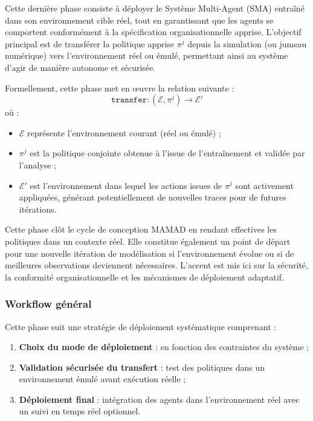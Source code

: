 \documentclass[pdflatex,sn-mathphys-num]{sn-jnl}%
\theoremstyle{thmstyleone}%
\theoremstyle{thmstyletwo}%
\theoremstyle{thmstylethree}%
\begin{document}
Cette dernière phase consiste à déployer le Système Multi-Agent (SMA) entraîné dans son environnement cible réel, tout en garantissant que les agents se comportent conformément à la spécification organisationnelle apprise. L'objectif principal est de transférer la politique apprise $\pi^j$ depuis la simulation (ou jumeau numérique) vers l'environnement réel ou émulé, permettant ainsi au système d'agir de manière autonome et sécurisée.

Formellement, cette phase met en œuvre la relation suivante :
\[
    \texttt{transfer}: \left( \mathcal{E}, \pi^j \right) \longrightarrow \mathcal{E}'
\]
où :
\begin{itemize}
    \item $\mathcal{E}$ représente l'environnement courant (réel ou émulé) ;
    \item $\pi^j$ est la politique conjointe obtenue à l'issue de l'entraînement et validée par l'analyse ;
    \item $\mathcal{E}'$ est l'environnement dans lequel les actions issues de $\pi^j$ sont activement appliquées, générant potentiellement de nouvelles traces pour de futures itérations.
\end{itemize}

Cette phase clôt le cycle de conception MAMAD en rendant effectives les politiques dans un contexte réel. Elle constitue également un point de départ pour une nouvelle itération de modélisation si l'environnement évolue ou si de meilleures observations deviennent nécessaires. L'accent est mis ici sur la sécurité, la conformité organisationnelle et les mécanismes de déploiement adaptatif.

\subsubsection{Workflow général}

Cette phase suit une stratégie de déploiement systématique comprenant :
\begin{enumerate}
    \item \textbf{Choix du mode de déploiement} : en fonction des contraintes du système ;
    \item \textbf{Validation sécurisée du transfert} : test des politiques dans un environnement émulé avant exécution réelle ;
    \item \textbf{Déploiement final} : intégration des agents dans l'environnement réel avec un suivi en temps réel optionnel.
\end{enumerate}
\end{document}
